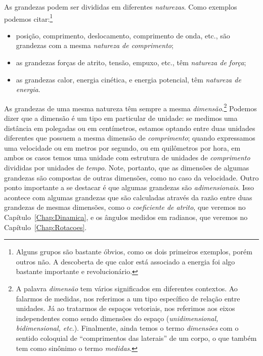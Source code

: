 As grandezas podem ser divididas em diferentes \emph{naturezas}. Como exemplos podemos citar:\footnote{Alguns grupos são bastante óbvios, como os dois primeiros exemplos, porém outros não. A descoberta de que calor está associado a energia foi algo bastante importante e revolucionário.} 
\begin{itemize}
    \item posição, comprimento, deslocamento, comprimento de onda, etc., são grandezas com a mesma \emph{natureza de comprimento};
    \item as grandezas forças de atrito, tensão, empuxo, etc., têm \emph{natureza de força};
    \item as grandezas calor, energia cinética, e energia potencial, têm \emph{natureza de energia}.
\end{itemize}

As grandezas de uma mesma natureza têm sempre a mesma \emph{dimensão}.\footnote{A palavra \emph{dimensão} tem vários significados em diferentes contextos. Ao falarmos de medidas, nos referimos a um tipo específico de relação entre unidades. Já ao tratarmos de espaços vetoriais, nos referimos aos eixos independentes como sendo dimensões do espaço (\emph{unidimensional, bidimensional, etc.}). Finalmente, ainda temos o termo \emph{dimensões} com o sentido coloquial de ``comprimentos das laterais'' de um corpo, o que também tem como sinônimo o termo \emph{medidas}.} Podemos dizer que a dimensão é um tipo em particular de unidade: se medimos uma distância em polegadas ou em centímetros, estamos optando entre duas unidades diferentes que possuem a mesma dimensão de \emph{comprimento}; quando expressamos uma velocidade ou em metros por segundo, ou em quilômetros por hora, em ambos os casos temos uma unidade com estrutura de unidades de \emph{comprimento} divididas por unidades de \emph{tempo}. Note, portanto, que as dimensões de algumas grandezas são compostas de outras dimensões, como no caso da velocidade. Outro ponto importante a se destacar é que algumas grandezas são \emph{adimensionais}. Isso acontece com algumas grandezas que são calculadas através da razão entre duas grandezas de mesmas dimensões, como o \emph{coeficiente de atrito}, que veremos no Capítulo~\ref{Chap:Dinamica}, e os ângulos medidos em radianos, que veremos no Capítulo~\ref{Chap:Rotacoes}.

